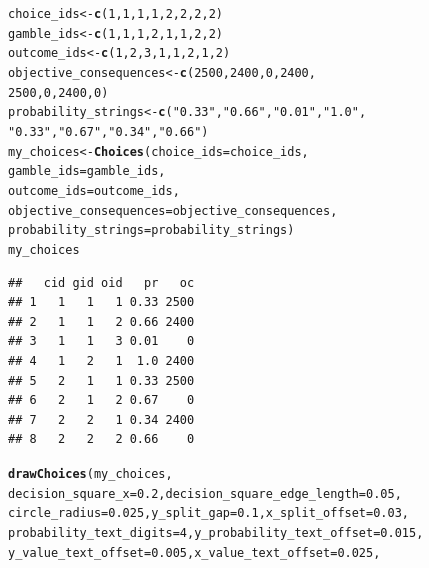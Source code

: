 \documentclass{article}\usepackage[]{graphicx}\usepackage[]{color}
\makeatletter
\newcommand{\hlnum}[1]{\textcolor[rgb]{0.686,0.059,0.569}{#1}}%
\newcommand{\hlstr}[1]{\textcolor[rgb]{0.192,0.494,0.8}{#1}}%
\newcommand{\hlstd}[1]{\textcolor[rgb]{0.345,0.345,0.345}{#1}}%
\newcommand{\hlkwb}[1]{\textcolor[rgb]{0.69,0.353,0.396}{#1}}%
\newcommand{\hlkwc}[1]{\textcolor[rgb]{0.333,0.667,0.333}{#1}}%
\newcommand{\hlkwd}[1]{\textcolor[rgb]{0.737,0.353,0.396}{\textbf{#1}}}%
\newenvironment{kframe}{%
 \def\at@end@of@kframe{}%
 \ifinner\ifhmode%
  \def\at@end@of@kframe{\end{minipage}}%
  \begin{minipage}{\columnwidth}%
 \fi\fi%
 \def\FrameCommand##1{\hskip\@totalleftmargin \hskip-\fboxsep
 \colorbox{shadecolor}{##1}\hskip-\fboxsep
     \hskip-\linewidth \hskip-\@totalleftmargin \hskip\columnwidth}%
 \MakeFramed {\advance\hsize-\width
   \@totalleftmargin\z@ \linewidth\hsize
   \@setminipage}}%
 {\par\unskip\endMakeFramed%
 \at@end@of@kframe}
\newenvironment{knitrout}{}{} %
\makeatother
\begin{document}
\begin{knitrout}
\color{fgcolor}\begin{kframe}
\begin{alltt}
\hlstd{choice_ids} \hlkwb{<-} \hlkwd{c}\hlstd{(}\hlnum{1}\hlstd{,} \hlnum{1}\hlstd{,} \hlnum{1}\hlstd{,} \hlnum{1}\hlstd{,} \hlnum{2}\hlstd{,} \hlnum{2}\hlstd{,} \hlnum{2}\hlstd{,} \hlnum{2}\hlstd{)}
\hlstd{gamble_ids} \hlkwb{<-} \hlkwd{c}\hlstd{(}\hlnum{1}\hlstd{,} \hlnum{1}\hlstd{,} \hlnum{1}\hlstd{,} \hlnum{2}\hlstd{,} \hlnum{1}\hlstd{,} \hlnum{1}\hlstd{,} \hlnum{2}\hlstd{,} \hlnum{2}\hlstd{)}
\hlstd{outcome_ids} \hlkwb{<-} \hlkwd{c}\hlstd{(}\hlnum{1}\hlstd{,} \hlnum{2}\hlstd{,} \hlnum{3}\hlstd{,} \hlnum{1}\hlstd{,} \hlnum{1}\hlstd{,} \hlnum{2}\hlstd{,} \hlnum{1}\hlstd{,} \hlnum{2}\hlstd{)}
\hlstd{objective_consequences} \hlkwb{<-} \hlkwd{c}\hlstd{(}\hlnum{2500}\hlstd{,} \hlnum{2400}\hlstd{,} \hlnum{0}\hlstd{,} \hlnum{2400}\hlstd{,}
        \hlnum{2500}\hlstd{,} \hlnum{0}\hlstd{,} \hlnum{2400}\hlstd{,} \hlnum{0}\hlstd{)}
\hlstd{probability_strings} \hlkwb{<-} \hlkwd{c}\hlstd{(}\hlstr{"0.33"}\hlstd{,} \hlstr{"0.66"}\hlstd{,} \hlstr{"0.01"}\hlstd{,} \hlstr{"1.0"}\hlstd{,}
        \hlstr{"0.33"}\hlstd{,} \hlstr{"0.67"}\hlstd{,} \hlstr{"0.34"}\hlstd{,} \hlstr{"0.66"}\hlstd{)}
\hlstd{my_choices} \hlkwb{<-} \hlkwd{Choices}\hlstd{(}\hlkwc{choice_ids}\hlstd{=choice_ids,}
        \hlkwc{gamble_ids}\hlstd{=gamble_ids,}
        \hlkwc{outcome_ids}\hlstd{=outcome_ids,}
        \hlkwc{objective_consequences}\hlstd{=objective_consequences,}
        \hlkwc{probability_strings}\hlstd{=probability_strings)}
\hlstd{my_choices}
\end{alltt}
\begin{verbatim}
##   cid gid oid   pr   oc
## 1   1   1   1 0.33 2500
## 2   1   1   2 0.66 2400
## 3   1   1   3 0.01    0
## 4   1   2   1  1.0 2400
## 5   2   1   1 0.33 2500
## 6   2   1   2 0.67    0
## 7   2   2   1 0.34 2400
## 8   2   2   2 0.66    0
\end{verbatim}
\begin{alltt}
\hlkwd{drawChoices}\hlstd{(my_choices,}
        \hlkwc{decision_square_x}\hlstd{=}\hlnum{0.2}\hlstd{,} \hlkwc{decision_square_edge_length}\hlstd{=}\hlnum{0.05}\hlstd{,}
        \hlkwc{circle_radius}\hlstd{=}\hlnum{0.025}\hlstd{,} \hlkwc{y_split_gap}\hlstd{=}\hlnum{0.1}\hlstd{,} \hlkwc{x_split_offset}\hlstd{=}\hlnum{0.03}\hlstd{,}
        \hlkwc{probability_text_digits}\hlstd{=}\hlnum{4}\hlstd{,} \hlkwc{y_probability_text_offset}\hlstd{=}\hlnum{0.015}\hlstd{,}
        \hlkwc{y_value_text_offset}\hlstd{=}\hlnum{0.005}\hlstd{,} \hlkwc{x_value_text_offset}\hlstd{=}\hlnum{0.025}\hlstd{,}

\end{alltt}
\end{kframe}
\end{knitrout}
\end{document}
